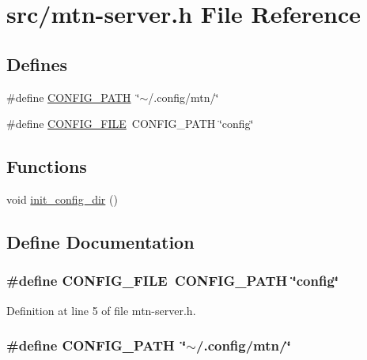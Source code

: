 \hypertarget{mtn-server_8h}{
\section{src/mtn-\/server.h File Reference}
\label{mtn-server_8h}
}
\subsection*{Defines}
\begin{DoxyCompactItemize}
\item 
\#define \hyperlink{mtn-server_8h_a863ab5d791c86f9dfff4c6e90624130c}{CONFIG\_\-PATH}~\char`\"{}$\sim$/.config/mtn/\char`\"{}
\item 
\#define \hyperlink{mtn-server_8h_a42bf63540ee0039a3a23db1b5ec3202b}{CONFIG\_\-FILE}~CONFIG\_\-PATH \char`\"{}config\char`\"{}
\end{DoxyCompactItemize}
\subsection*{Functions}
\begin{DoxyCompactItemize}
\item 
void \hyperlink{mtn-server_8h_a629e6496f7ab540d8441fd8b3b6c2e13}{init\_\-config\_\-dir} ()
\end{DoxyCompactItemize}


\subsection{Define Documentation}
\hypertarget{mtn-server_8h_a42bf63540ee0039a3a23db1b5ec3202b}{
\subsubsection[{CONFIG\_\-FILE}]{\setlength{\rightskip}{0pt plus 5cm}\#define CONFIG\_\-FILE~CONFIG\_\-PATH \char`\"{}config\char`\"{}}}
\label{mtn-server_8h_a42bf63540ee0039a3a23db1b5ec3202b}


Definition at line 5 of file mtn-\/server.h.

\hypertarget{mtn-server_8h_a863ab5d791c86f9dfff4c6e90624130c}{
\subsubsection[{CONFIG\_\-PATH}]{\setlength{\rightskip}{0pt plus 5cm}\#define CONFIG\_\-PATH~\char`\"{}$\sim$/.config/mtn/\char`\"{}}}
\label{mtn-server_8h_a863ab5d791c86f9dfff4c6e90624130c}


